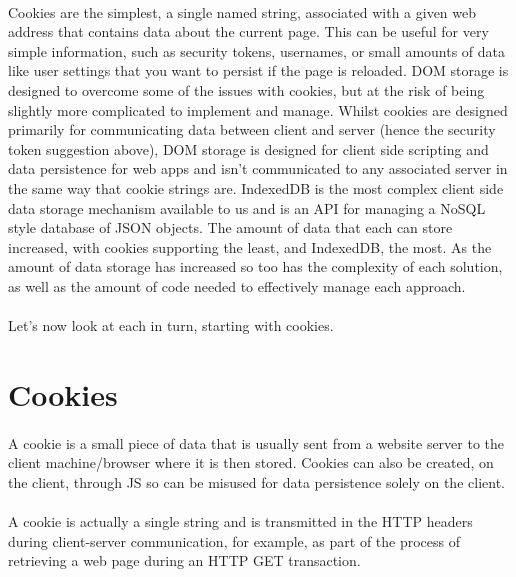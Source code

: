 \paragraph{} Cookies are the simplest, a single named string, associated with a given web address that contains  data about the current page. This can be useful for very simple information, such as security tokens, usernames, or small amounts of data like user settings that you want to persist if the page is reloaded. DOM storage is designed to overcome some of the issues with cookies, but at the risk of being slightly more complicated to implement and manage. Whilst cookies are designed primarily for communicating data between client and server (hence the security token suggestion above), DOM storage is designed for client side scripting and data persistence for web apps and isn't communicated to any associated server in the same way that cookie strings are. IndexedDB is the most complex client side data storage mechanism available to us and is an API for managing a NoSQL style database of JSON objects. The amount of data that each can store increased, with cookies supporting the least, and IndexedDB, the most. As the amount of data storage has increased so too has the complexity of each solution, as well as the amount of code needed to effectively manage each approach.

\paragraph{} Let's now look at each in turn, starting with cookies.


\section{Cookies}
\paragraph{} A cookie is a small piece of data that is usually sent from a website server to the client machine/browser where it is then stored. Cookies can also be created, on the client, through JS so can be misused for data persistence solely on the client.
\paragraph{} A cookie is actually a single string and is transmitted in the HTTP headers during client-server communication, for example, as part of the process of retrieving a web page during an HTTP GET transaction.
